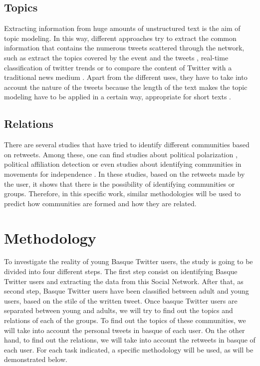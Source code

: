 \documentclass[information,article,submit,moreauthors,pdftex,10pt,a4paper]{Definitions/mdpi}
\begin{document}
\subsection{Topics}\label{sec:topics_background}

Extracting information from huge amounts of unstructured text is the aim of topic modeling. In this way, different approaches try to extract the common information that contains the numerous tweets scattered through the network, such as extract the topics covered by the event and the tweets \citep{hu2012lda}, real-time classification of twitter trends \citep{zubiaga2015real} or to compare the content of Twitter with a traditional news medium \citep{zhao2011comparing}. Apart from the different uses, they have to take into account the nature of the tweets because the length of the text makes the topic modeling have to be applied in a certain way, appropriate for short texts \citep{hong2010empirical}.

\subsection{Relations}\label{sec:connections_background}

There are several studies that have tried to identify different communities based on retweets. Among these, one can find studies about political polarization \citep{conover2011political}, political affiliation detection \citep{pennacchiotti2011democrats} or even studies about identifying communities in movements for independence \citep{zubiaga2017stance}. In these studies, based on the retweets made by the user, it shows that there is the possibility of identifying communities or groups. Therefore, in this specific work, similar methodologies will be used to predict how communities are formed and how they are related.

\section{Methodology}\label{sec:methodology}

To investigate the reality of young Basque Twitter users, the study is going to be divided into four different steps. The first step consist on identifying Basque Twitter users and extracting the data from this Social Network. After that, as second step, Basque Twitter users have been classified between adult and young users, based on the stile of the written tweet. Once basque Twitter users are separated between young and adults, we will try to find out the topics and relations of each of the groups. To find out the topics of these communities, we will take into account the personal tweets in basque of each user. On the other hand, to find out the relations, we will take into account the retweets in basque of each user. For each task indicated, a specific methodology will be used, as will be demonstrated below.
\end{document}
